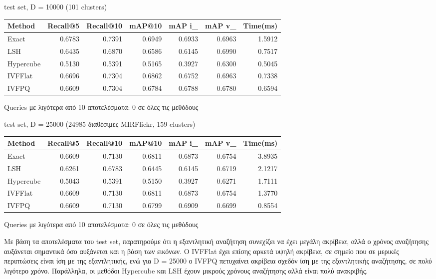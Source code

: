 \documentclass [conference]{IEEEtran}
\begin{document}
\begin{table}[H]
    \centering
    \footnotesize
    \setlength{\tabcolsep}{3pt}
    test set, D = 10000 (101 clusters)
    \par\smallskip
    \begin{tabular}{l r r r r r r}
    \hline
    \textbf{Method} & \textbf{Recall@5} & \textbf{Recall@10} & \textbf{mAP@10} & \textbf{mAP i\_} & \textbf{mAP v\_} & \textbf{Time(ms)} \\
    \hline
    Exact     & 0.6783 & 0.7391 & 0.6949 & 0.6933 & 0.6963 & 1.5912 \\
    LSH       & 0.6435 & 0.6870 & 0.6586 & 0.6145 & 0.6990 & 0.7517 \\
    Hypercube & 0.5130 & 0.5391 & 0.5165 & 0.3927 & 0.6300 & 0.5045 \\
    IVFFlat   & 0.6696 & 0.7304 & 0.6862 & 0.6752 & 0.6963 & 0.7338 \\
    IVFPQ  & 0.6609 & 0.7304 & 0.6784 & 0.6788 & 0.6780 & 0.6594 \\
    \hline
    \end{tabular}
    \par\smallskip
    \footnotesize Queries με λιγότερα από 10 αποτελέσματα: 0 σε όλες τις μεθόδους
\end{table}

\begin{table}[H]
    \centering
    \footnotesize
    \setlength{\tabcolsep}{3pt}
    test set, D = 25000 (24985 διαθέσιμες MIRFlickr, 159 clusters)
    \par\smallskip
    \begin{tabular}{l r r r r r r}
    \hline
    \textbf{Method} & \textbf{Recall@5} & \textbf{Recall@10} & \textbf{mAP@10} & \textbf{mAP i\_} & \textbf{mAP v\_} & \textbf{Time(ms)} \\
    \hline
    Exact     & 0.6609 & 0.7130 & 0.6811 & 0.6873 & 0.6754 & 3.8935 \\
    LSH       & 0.6261 & 0.6783 & 0.6445 & 0.6145 & 0.6719 & 2.1217 \\
    Hypercube & 0.5043 & 0.5391 & 0.5150 & 0.3927 & 0.6271 & 1.7111 \\
    IVFFlat   & 0.6609 & 0.7130 & 0.6811 & 0.6873 & 0.6754 & 1.3770 \\
    IVFPQ  & 0.6609 & 0.7130 & 0.6799 & 0.6909 & 0.6699 & 0.8554 \\
    \hline
    \end{tabular}
    \par\smallskip
    \footnotesize Queries με λιγότερα από 10 αποτελέσματα: 0 σε όλες τις μεθόδους
\end{table}

Με βάση τα αποτελέσματα του test set, παρατηρούμε ότι η εξαντλητική αναζήτηση συνεχίζει να έχει μεγάλη ακρίβεια, αλλά ο χρόνος αναζήτησης αυξάνεται σημαντικά όσο αυξάνεται και η βάση των εικόνων. Ο IVFFlat έχει επίσης αρκετά υψηλή ακρίβεια, σε σημείο που σε μερικές περιπτώσεις είναι ίση με της εξαντλητικής, ενώ για D = 25000 ο IVFPQ πετυχαίνει ακρίβεια σχεδόν ίση με της εξαντλητικής αναζήτησης, σε πολύ λιγότερο χρόνο. Παράλληλα, οι μεθόδοι Hypercube και LSH έχουν μικρούς χρόνους αναζήτησης αλλά είναι πολύ ανακριβής.
\end{document}
